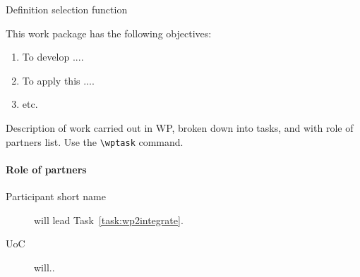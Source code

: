 \begin{workpackage}{Definition selection function}
  \label{wp:selfundefinition}

  \makewptable %

  \begin{wpobjectives}
    This work package has the following objectives:
    \begin{enumerate}
      \item To develop ....
      \item To apply this ....
      \item etc.
    \end{enumerate}
  \end{wpobjectives}

  \begin{wpdescription}

    Description of work carried out in WP, broken down into tasks, and
    with role of partners list. Use the \texttt{\textbackslash wptask} command.


    \paragraph{Role of partners}
    \begin{description}
      \item[Participant short name] will lead Task~\ref{task:wp2integrate}.
      \item[UoC] will..
    \end{description}
  \end{wpdescription}

  \begin{wpdeliverables}

    \label{dev:wp2specs}

    \label{dev:wp2implementation}

    \label{dev:wp2prototype}

  \end{wpdeliverables}

\end{workpackage}


